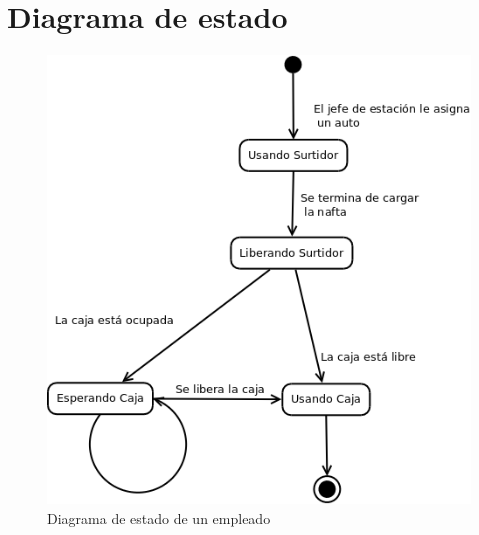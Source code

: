 \documentclass[12pt,a4paper,titlepage,oneside]{article}
\begin{document}
\section{Diagrama de estado}
\begin{figure}[hbtp]
\begin{center}
\includegraphics[scale=0.5]{diagrama_estado_empleado.png}
\end{center}
\caption[Long caption]{Diagrama de estado de un empleado}
\end{figure}
\end{document}
